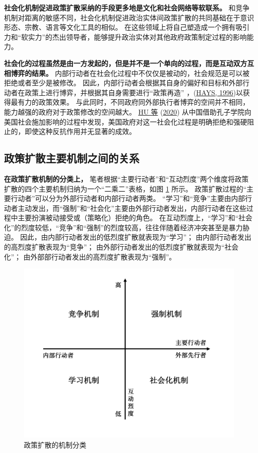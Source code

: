 \documentclass[
  12pt,
]{ctexart}
\begin{document}
\textbf{社会化机制促进政策扩散采纳的手段更多地是文化和社会网络等软联系。}
和竞争机制对距离的敏感不同，社会化机制促进政治实体间政策扩散的共同基础在于意识形态、宗教、语言等文化工具的相似。
在这些领域上将自己塑造成一个拥有吸引力和``软实力''的杰出领导者，能够提升政治实体对其他政府政策制定过程的影响能力。

\textbf{社会化的过程虽然是由一方发起的，但是并不是一个单向的过程，而是互动双方互相博弈的结果。}
内部行动者在社会化过程中不仅仅是被动的，社会规范是可以被拒绝或者至少是被修改。
因此，内部行动者会根据其自身的偏好和目标和外部行动者在政策上进行博弈，并根据其自身需要进行``政策再造'' ，(\protect\hyperlink{ref-Hays1996}{HAYS, 1996})以获得最有力的政策效果。
与此同时，不同政府同外部执行者博弈的空间并不相同，能力越强的政府对于政策修改的空间越大。
\protect\hyperlink{ref-HuEtAl2020a}{HU 等} (\protect\hyperlink{ref-HuEtAl2020a}{2020}) 从中国借助孔子学院向美国社会施加影响的过程中发现，美国政府对这一社会化过程是明确拒绝和强硬阻止的，即使这种反抗作用并无显著的成效。

\hypertarget{ux653fux7b56ux6269ux6563ux4e3bux8981ux673aux5236ux4e4bux95f4ux7684ux5173ux7cfb}{%
\subsection{政策扩散主要机制之间的关系}\label{ux653fux7b56ux6269ux6563ux4e3bux8981ux673aux5236ux4e4bux95f4ux7684ux5173ux7cfb}}

\textbf{在政策扩散机制的分类上，}
笔者根据``主要行动者''和``互动烈度''两个维度将政策扩散的四个主要机制归纳为一个``二乘二''表格，如图 \ref{fig:Classification} 所示。
政策扩散过程的``主要行动者''可以分为外部行动者和内部行动者两类。
``学习''和``竞争''主要由内部行动者主动发出，而``强制''和``社会化''主要由外部行动者发出，内部行动者在这些过程中主要扮演被动接受或（策略化）拒绝的角色。
在互动烈度上，``学习''和``社会化''的烈度较低，``竞争''和``强制''的烈度较高，往往伴随着经济冲突甚至是暴力胁迫。
因此，由内部行动者发出的低烈度扩散就表现为``学习''；
由内部行动者发出的高烈度扩散表现为``竞争''；
由外部行动者发出的低烈度扩散就表现为``社会化''；
由外部部行动者发出的高烈度扩散表现为``强制''。

\begin{figure}

{\centering \includegraphics[width=0.6\linewidth]{../figures/政策扩散的机制分类} 

}

\caption{政策扩散的机制分类}\label{fig:Classification}
\end{figure}
\end{document}
